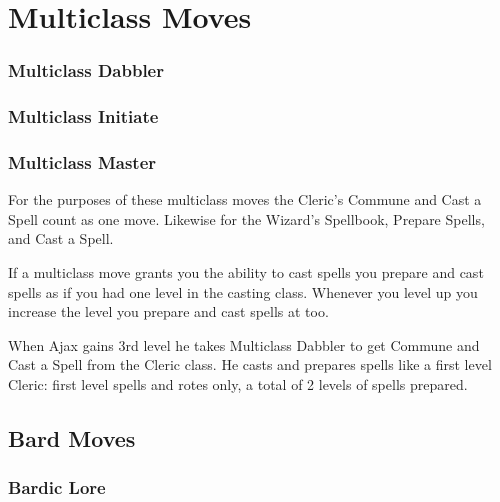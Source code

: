 \chapter{Multiclass Moves}
   
       
\subsection{Multiclass Dabbler}    
       
\subsection{Multiclass Initiate}    
       
\subsection{Multiclass Master}    
       

For the purposes of these multiclass moves the Cleric's Commune and Cast a Spell count as one move. Likewise for the Wizard's Spellbook, Prepare Spells, and Cast a Spell.

       

If a multiclass move grants you the ability to cast spells you prepare and cast spells as if you had one level in the casting class. Whenever you level up you increase the level you prepare and cast spells at too.

       
\startExample
When Ajax gains 3rd level he takes Multiclass Dabbler to get Commune and Cast a Spell from the Cleric class. He casts and prepares spells like a first level Cleric: first level spells and rotes only, a total of 2 levels of spells prepared.
\stopExample
       
\section{Bard Moves}    
       
\subsection{Bardic Lore}    
       

